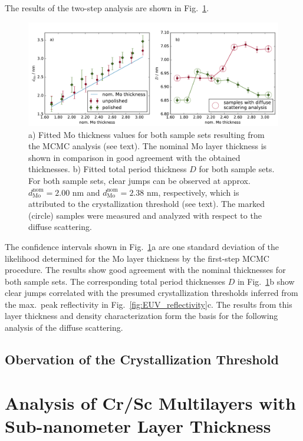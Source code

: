 The results of the two-step analysis are shown in Fig.~\ref{fig:fitted_mo_and_fitted_D}.
\begin{figure}[htbp]
\centering
\includegraphics[width=\textwidth]{images/fitted_mo_and_fitted_D}
\caption{a) Fitted Mo thickness values for both sample sets resulting from the MCMC analysis (see text). The nominal Mo layer thickness is shown in comparison in good agreement with the obtained thicknesses. b) Fitted total period thickness $D$ for both sample sets. For both sample sets, clear jumps can be observed at approx.~$d^\text{nom}_\text{Mo} =2.00$ nm and $d^\text{nom}_\text{Mo} =2.38$ nm, respectively, which is attributed to the crystallization threshold (see text). The marked (circle) samples were measured and analyzed with respect to the diffuse scattering.}
\label{fig:fitted_mo_and_fitted_D}
\end{figure}
The confidence intervals shown in Fig.~\ref{fig:fitted_mo_and_fitted_D}a are one standard deviation of the likelihood determined for the Mo layer thickness by the first-step MCMC procedure. The results show good agreement with the nominal thicknesses for both sample sets. The corresponding total period thicknesses $D$ in Fig.~\ref{fig:fitted_mo_and_fitted_D}b show clear jumps correlated with the presumed crystallization thresholds inferred from the max.~peak reflectivity in Fig.~\ref{fig:EUV_reflectivity}c. The results from this layer thickness and density characterization form the basis for the following analysis of the diffuse scattering.

\subsection{Obervation of the Crystallization Threshold}


\section{Analysis of Cr/Sc Multilayers with Sub-nanometer Layer Thickness}


